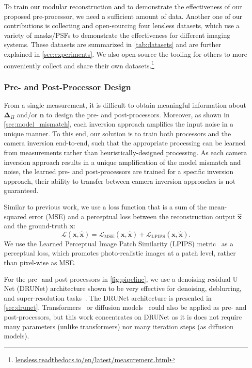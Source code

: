 To train our modular reconstruction and to demonstrate the effectiveness of our proposed pre-processor,
we need a sufficient amount of data.
Another one of our contributions is collecting and open-sourcing four lensless datasets,
which use a variety of masks/PSFs to demonstrate the effectiveness for different imaging systems.
These datasets are summarized in \cref{tab:datasets} and are further explained in \cref{sec:experiments}.
We also open-source the tooling for others to more conveniently collect and share their own datasets.\footnote{\href{https://lensless.readthedocs.io/en/latest/measurement.html}{lensless.readthedocs.io/en/latest/measurement.html}}

\subsubsection{Pre- and Post-Processor Design}
\label{sec:processors}

From a single measurement, it is difficult to obtain meaningful information about $\bm{\Delta}_H$ and/or $\bm{n}$ to design the pre- and post-processors.
Moreover, 
as shown in \cref{sec:model_mismatch}, 
each inversion approach amplifies the input noise in a unique manner.
To this end, our solution is to train both processors and the camera inversion end-to-end, such that the appropriate processing can be learned from measurements rather than heuristically-designed processing.
As each camera inversion approach results in a unique amplification of the model mismatch and noise,
the learned pre- and post-processors are trained for a specific inversion approach,
\ie their ability to transfer between camera inversion approaches is not guaranteed. 

Similar to previous work, we use a loss function that is a sum of the mean-squared error (MSE) and a perceptual loss between the reconstruction output $\bm{\hat{x}}$ and the ground-truth $\bm{x}$:
\begin{equation}
    \label{eq:loss_mse_lpips}
    \mathscr{L}\left(\bm{x},\bm{\hat{x}}\right) = \mathscr{L}_{\text{MSE}}\left(\bm{x},\bm{\hat{x}}\right) + \mathscr{L}_{\text{LPIPS}}\left(\bm{x},\bm{\hat{x}}\right).
\end{equation}
We use the Learned Perceptual Image Patch Similarity (LPIPS) metric~\cite{zhang2018perceptual} as a perceptual loss, which promotes photo-realistic images at a patch level, rather than pixel-wise as MSE.

For the pre- and post-processors in \cref{fig:pipeline},
we use a denoising residual U-Net (DRUNet) architecture  shown to be very effective for denoising, deblurring, and super-resolution tasks~\cite{zhang2021plug}.
The DRUNet architecture is presented in \cref{sec:drunet}.
Transformers~\cite{Zamir2021Restormer,Pan:22} or diffusion models~\cite{cai2024phocolens} could also be applied as pre- and post-processors,
but this work concentrates on DRUNet as it is does not require many parameters (unlike transformers) nor many iteration steps (as diffusion models).


